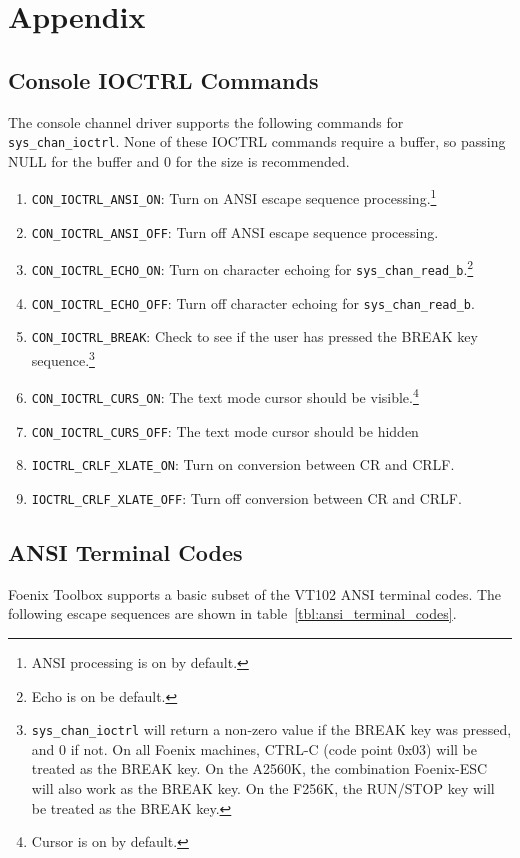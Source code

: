 \chapter{Appendix}

\section{Console IOCTRL Commands}
The console channel driver supports the following commands for \verb+sys_chan_ioctrl+.
None of these IOCTRL commands require a buffer, so passing NULL for the buffer and 0 for the size is recommended.

\begin{enumerate}
	\item \verb+CON_IOCTRL_ANSI_ON+: Turn on ANSI escape sequence processing.\footnote{ANSI processing is on by default.}
	\item \verb+CON_IOCTRL_ANSI_OFF+: Turn off ANSI escape sequence processing.
	\item \verb+CON_IOCTRL_ECHO_ON+: Turn on character echoing for \verb+sys_chan_read_b+.\footnote{Echo is on be default.}
	\item \verb+CON_IOCTRL_ECHO_OFF+: Turn off character echoing for \verb+sys_chan_read_b+.
	\item \verb+CON_IOCTRL_BREAK+: Check to see if the user has pressed the BREAK key sequence.\footnote{{\tt sys\_chan\_ioctrl} will return a non-zero value if the BREAK key was pressed, and 0 if not. On all Foenix machines, CTRL-C (code point 0x03) will be treated as the BREAK key. On the A2560K, the combination Foenix-ESC will also work as the BREAK key. On the F256K, the RUN/STOP key will be treated as the BREAK key.}
	\item \verb+CON_IOCTRL_CURS_ON+: The text mode cursor should be visible.\footnote{Cursor is on by default.}
	\item \verb+CON_IOCTRL_CURS_OFF+: The text mode cursor should be hidden
	\item \verb+IOCTRL_CRLF_XLATE_ON+: Turn on conversion between CR and CRLF.
	\item \verb+IOCTRL_CRLF_XLATE_OFF+: Turn off conversion between CR and CRLF.
\end{enumerate}

\section{ANSI Terminal Codes}
Foenix Toolbox supports a basic subset of the VT102 ANSI terminal codes. The following escape sequences are shown in table~\ref{tbl:ansi_terminal_codes}.

